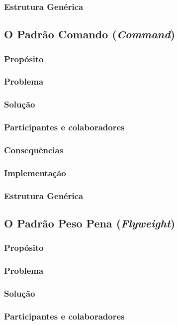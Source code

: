 \documentclass[
	11pt,				%
	openright,
	twoside,			%
	a4paper,			%
	english,			%
	french,
	brazil,				%
	sumario=tradicional
	]{abntex2}
\begin{document}
\subsubsection{Estrutura Genérica}

\subsection{O Padrão Comando (\textit{Command})}
\subsubsection{Propósito}
\subsubsection{Problema}
\subsubsection{Solução}
\subsubsection{Participantes e colaboradores}
\subsubsection{Consequências}
\subsubsection{Implementação}
\subsubsection{Estrutura Genérica}

\subsection{O Padrão Peso Pena (\textit{Flyweight})}
\subsubsection{Propósito}
\subsubsection{Problema}
\subsubsection{Solução}
\subsubsection{Participantes e colaboradores}
\end{document}
